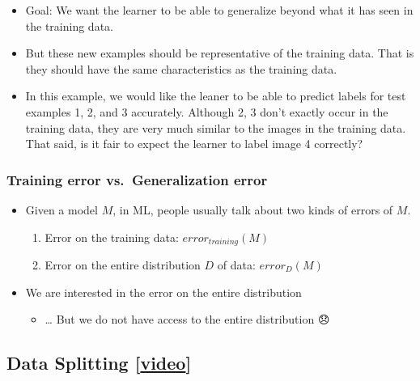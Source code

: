 \documentclass[11pt]{article}
\providecommand{\tightlist}{%
      \setlength{\itemsep}{0pt}\setlength{\parskip}{0pt}}
\begin{document}
    \begin{itemize}
\tightlist
\item
  Goal: We want the learner to be able to generalize beyond what it has
  seen in the training data.
\item
  But these new examples should be representative of the training data.
  That is they should have the same characteristics as the training
  data.
\item
  In this example, we would like the leaner to be able to predict labels
  for test examples 1, 2, and 3 accurately. Although 2, 3 don't exactly
  occur in the training data, they are very much similar to the images
  in the training data. That said, is it fair to expect the learner to
  label image 4 correctly?
\end{itemize}

    \subsubsection{Training error vs.~Generalization
error}\label{training-error-vs.-generalization-error}

\begin{itemize}
\tightlist
\item
  Given a model \(M\), in ML, people usually talk about two kinds of
  errors of \(M\).

  \begin{enumerate}
  \def\labelenumi{\arabic{enumi}.}
  \tightlist
  \item
    Error on the training data: \(error_{training}(M)\)
  \item
    Error on the entire distribution \(D\) of data: \(error_{D}(M)\)
  \end{enumerate}
\item
  We are interested in the error on the entire distribution

  \begin{itemize}
  \tightlist
  \item
    \ldots{} But we do not have access to the entire distribution 😞
  \end{itemize}
\end{itemize}

    

    \subsection{\texorpdfstring{Data Splitting
{[}\href{https://youtu.be/h2AEobwcUQw}{video}{]}}{Data Splitting {[}video{]}}}\label{data-splitting-video}
\end{document}
